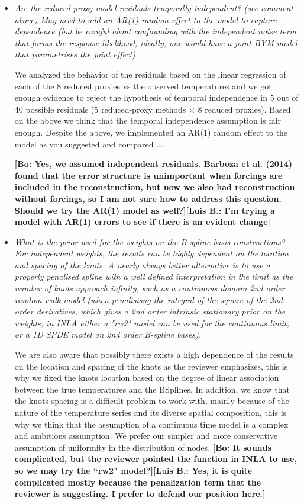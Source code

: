 \documentclass[11pt]{article}
\newcommand{\lb}[1]{\color{ForestGreen}\textbf{[Luis B.: #1]}\normalcolor}
\newcommand{\bl}[1]{\color{red}\textbf{[Bo: #1]}\normalcolor}
\begin{document}
\begin{itemize}
\item \textit{Are the reduced proxy model residuals temporally independent? (see
  comment above) May need to add an AR(1) random effect to the model to capture
  dependence (but be careful about confounding with the independent
  noise term that forms the response likelihood; ideally, one would
  have a joint BYM model that parametrises the joint effect).}

We analyzed the behavior of the residuals based on the linear regression of
each of the 8 reduced proxies vs the observed temperatures and we got enough
evidence to reject the hypothesis of temporal independence in 5 out of 40
possible residuals (5 reduced-proxy methods $\times$ 8 reduced proxies). Based
on the above we think that the temporal independence assumption is fair enough.
Despite the above, we implemented an AR(1) random effect to the model as you
suggested and compared ... 

\bl{Yes, we assumed independent residuals. Barboza et al. (2014) found that the
  error structure is unimportant when forcings are included in the
  reconstruction, but now we also had reconstruction without forcings, so I am
  not sure how to address this question. Should we try the AR(1) model as
  well?}\lb{I'm trying a model with AR(1) errors to see if there is an
  evident change}

\item \textit{What is the prior used for the weights on the B-spline basis
  constructions? For independent weights, the results can be highly
  dependent on the location and spacing of the knots. A nearly always
  better alternative is to use a properly penalised spline with a well
  defined interpretation in the limit as the number of knots approach
  infinity, such as a continuous domain 2nd order random walk model
  (when penalisisng the integral of the square of the 2nd order
  derivatives, which gives a 2nd order intrinsic stationary prior on
  the weights; in INLA either a "rw2" model can be used for the
  continuous limit, or a 1D SPDE model on 2nd order B-spline bases).}

We are also aware that possibly there exists a high dependence of the results on the location and spacing of the knots as the
reviewer emphasizes, this is why we fixed the knots location based on the
degree of linear association between the true temperatures and the BSplines. In
addition, we know
that the knots spacing is a difficult problem to work with, mainly because of the
nature of the temperature series and its diverse spatial composition, this is
why we think that the assumption of a continuous time model is a complex and
ambitious assumption. We prefer our simpler and more conservative assumption of uniformity in the distribution of nodes.    
\bl{It sounds complicated, but the reviewer pointed the function in INLA to use,
  so we may try the ``rw2" model?}\lb{Yes, it is quite complicated mostly
  because the penalization term that the reviewer is suggesting. I prefer to defend our position here.}


\end{itemize}
\end{document}

